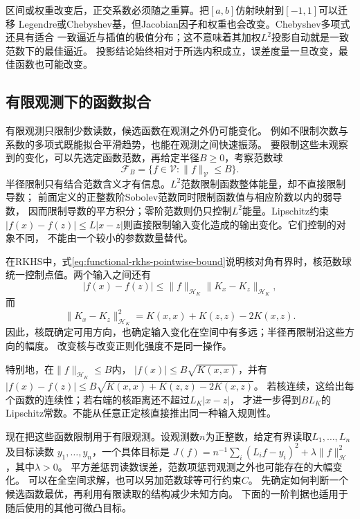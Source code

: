 区间或权重改变后，正交系数必须随之重算。把$[a,b]$仿射映射到$[-1,1]$可以迁移
Legendre或Chebyshev基，但Jacobian因子和权重也会改变。Chebyshev多项式还具有适合
一致逼近与插值的极值分布；这不意味着其加权$L^2$投影自动就是一致范数下的最佳逼近。
投影结论始终相对于所选内积成立，误差度量一旦改变，最佳函数也可能改变。

\subsection{有限观测下的函数拟合}
\label{sec:functional-finite-observation-fitting}
\label{sec:functional-class-size-smoothness}


有限观测只限制少数读数，候选函数在观测之外仍可能变化。
例如不限制次数与系数的多项式既能拟合平滑趋势，也能在观测之间快速振荡。
要限制这些未观察到的变化，可以先选定函数范数，再给定半径$B\geq0$，考察范数球
\[
  \mathcal{F}_B
  =
  \{f\in\mathcal{V}:\lVert f\rVert_{\mathcal{V}}\leq B\}.
\]
半径限制只有结合范数含义才有信息。$L^2$范数限制函数整体能量，却不直接限制导数；
前面定义的正整数阶Sobolev范数同时限制函数值与相应阶数以内的弱导数，
因而限制导数的平方积分；零阶范数则仍只控制$L^2$能量。Lipschitz约束
$|f(x)-f(z)|\leq L|x-z|$则直接限制输入变化造成的输出变化。它们控制的对象不同，
不能由一个较小的参数数量替代。

在RKHS中，式\eqref{eq:functional-rkhs-pointwise-bound}说明核对角有界时，核范数球
统一控制点值。两个输入之间还有
\begin{equation}
  |f(x)-f(z)|
  \leq
  \lVert f\rVert_{\mathcal{H}_K}
  \lVert K_x-K_z\rVert_{\mathcal{H}_K},
  \label{eq:functional-rkhs-modulus-bound}
\end{equation}
而
\[
  \lVert K_x-K_z\rVert_{\mathcal{H}_K}^2
  =
  K(x,x)+K(z,z)-2K(x,z).
\]
因此，核既确定可用方向，也确定输入变化在空间中有多远；半径再限制沿这些方向的幅度。
改变核与改变正则化强度不是同一操作。

特别地，在$\lVert f\rVert_{\mathcal H_K}\leq B$内，
$|f(x)|\leq B\sqrt{K(x,x)}$，并有
$|f(x)-f(z)|\leq B\sqrt{K(x,x)+K(z,z)-2K(x,z)}$。
若核连续，这给出每个函数的连续性；若右端的核距离还不超过$L_K|x-z|$，
才进一步得到$BL_K$的Lipschitz常数。不能从任意正定核直接推出同一种输入规则性。

现在把这些函数限制用于有限观测。设观测数$n$为正整数，给定有界读取$L_1,\ldots,L_n$及目标读数
$y_1,\ldots,y_n$，一个具体目标是
$J(f)=n^{-1}\sum_i(L_if-y_i)^2+\lambda\lVert f\rVert_{\mathcal H}^2$，其中$\lambda>0$。
平方差惩罚读数误差，范数项惩罚观测之外也可能存在的大幅变化。
可以在全空间求解，也可以另加范数球等可行约束$C$。
先确定如何判断一个候选函数最优，再利用有限读取的结构减少未知方向。
下面的一阶判据也适用于随后使用的其他可微凸目标。

